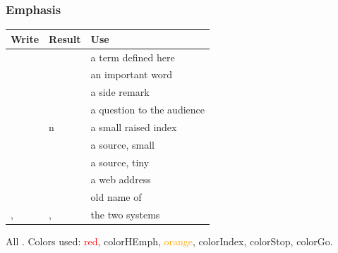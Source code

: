 \documentclass[aspectratio=169,10pt,compress]{beamer}
\begin{document}
\begin{frame}[t,fragile] \frametitle{Emphasis}

\begin{table}
		\footnotesize
		\begin{tabular}{@{}L{0.36\textwidth}L{0.30\textwidth}L{0.26\textwidth}@{}}
			\toprule
			\textbf{Write} & \textbf{Result} & \textbf{Use} \\
			\midrule
			 &      & a term defined here \\
			     &        & an important word \\
			       &           & a side remark \\
			      &          & a question to the audience \\
			           & n              & a small raised index \\
			     &         & a source, small \\
			        &            & a source, tiny \\
			     &         & a web address \\
			         &             & old name of  \\
			,  & \win, \mac      & the two systems \\
			\bottomrule
		\end{tabular}
\end{table}%

	\small All . Colors used: \textcolor{red}{red}, \textcolor{colorHEmph}{colorHEmph}, \textcolor{orange}{orange},
	\textcolor{colorIndex}{colorIndex}, \textcolor{colorStop}{colorStop}, \textcolor{colorGo}{colorGo}.
\end{frame}
\end{document}
